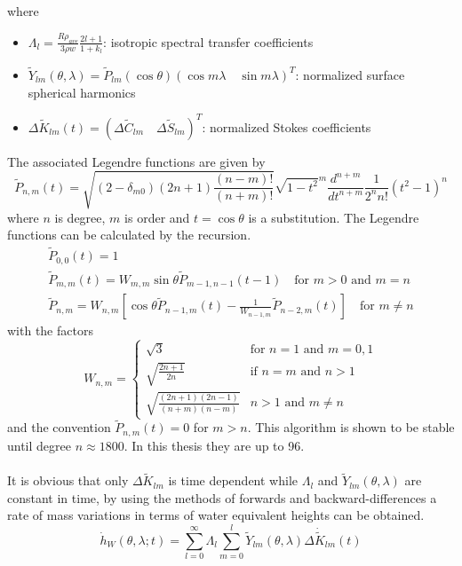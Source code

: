 where 
\begin{itemize}
	\item $\Lambda_{l} = \frac{R \rho_{ave}}{3 \rho w} \frac{2l+1}{1+k_{l}}$: isotropic spectral transfer coefficients
	\item $\tilde{Y}_{lm}(\theta,\lambda) = \tilde{P}_{lm}(\cos \theta)(\cos m\lambda \quad \sin m \lambda)^{T}$: normalized surface spherical harmonics
	\item $ \Delta \tilde{K}_{lm}(t) = (\Delta \tilde{C}_{lm} \quad \Delta \tilde{S}_{lm})^{T}$: normalized Stokes coefficients
\end{itemize}
The associated Legendre functions are given by
\begin{equation}
\tilde{P}_{n,m}(t) = \sqrt{(2-\delta_{m0})(2n+1)\frac{(n-m)!}{(n+m)!}}\sqrt{1-t^2}^{m}\frac{d^{n+m}}{dt^{n+m}}\frac{1}{2^n n!}(t^2 - 1)^n
\end{equation}
where $n$ is degree, $m$ is order and $t= \cos \theta$ is a substitution. The Legendre functions can be calculated by the recursion.
\begin{gather}
\tilde{P}_{0,0}(t) = 1 \\
\tilde{P}_{m,m}(t) = W_{m,m}\sin \theta \tilde{P}_{m-1,n-1}(t-1) \quad  \text{for $m > 0$ and $m =n$} \\
\tilde{P}_{n,m} = W_{n,m}[\cos \theta \tilde{P}_{n-1,m}(t) - \frac{1}{W_{n-1,m}} \tilde{P}_{n-2,m}(t)] \quad \text{for $m \neq n$}
\end{gather}       
with the factors
\begin{equation}
W_{n,m} = \begin{cases}
\sqrt{3} & \text{for $n = 1$ and $m = {0,1}$}\\
\sqrt{\frac{2n+1}{2n}} & \text{if $n=m$ and $n>1$} \\
\sqrt{\frac{(2n+1)(2n-1)}{(n+m)(n-m)}} & \text{$n>1$ and $m \neq n$}
\end{cases}
\end{equation}                   
and the convention $\tilde{P}_{n,m}(t) = 0$ for  $m>n$. This algorithm is shown to be stable until degree $n \approx 1800$. In this thesis they are up to 96. \\\\
It is obvious that only $\Delta \tilde{K}_{lm}$ is time dependent while $\Lambda_{l}$ and $\tilde{Y}_{lm}(\theta,\lambda)$ are constant in time, by using the methods of forwards and backward-differences a rate of mass variations in terms of water equivalent heights can be obtained.
\begin{equation}
\dot{h}_{W}(\theta,\lambda;t) = \sum_{l=0}^{\infty} \Lambda_{l} \sum_{m=0}^{l} \tilde{Y}_{lm}(\theta,\lambda) \Delta \dot{\tilde{K}}_{lm}(t)
\end{equation}
